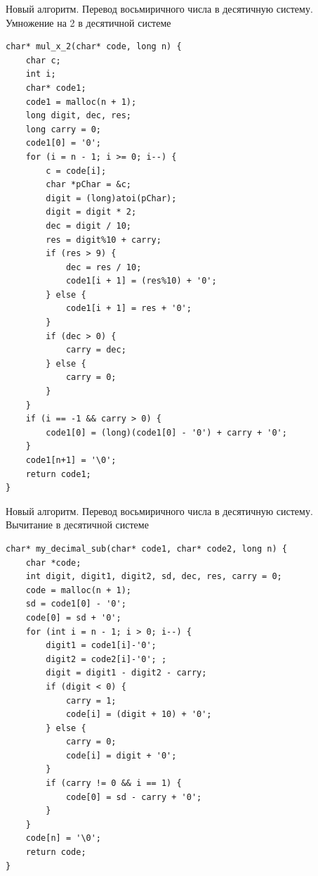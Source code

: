 \documentclass[14pt, russian]{scrartcl}
\begin{document}
\newpage
\begin{code}
\caption{Новый алгоритм. Перевод восьмиричного числа в десятичную систему. Умножение на 2 в десятичной системе}
\label{lst:octaladd}
\begin{verbatim}
char* mul_x_2(char* code, long n) {
    char c;
    int i;
    char* code1;
    code1 = malloc(n + 1);
    long digit, dec, res;
    long carry = 0;
    code1[0] = '0';
    for (i = n - 1; i >= 0; i--) {
        c = code[i];
        char *pChar = &c;
        digit = (long)atoi(pChar); 
        digit = digit * 2;
        dec = digit / 10;
        res = digit%10 + carry;
        if (res > 9) {
            dec = res / 10;
            code1[i + 1] = (res%10) + '0';
        } else {
            code1[i + 1] = res + '0';
        }
        if (dec > 0) {
            carry = dec;
        } else {
            carry = 0;
        }
    }
    if (i == -1 && carry > 0) {
        code1[0] = (long)(code1[0] - '0') + carry + '0';
    }
    code1[n+1] = '\0';
    return code1;
}
\end{verbatim}
\end{code}

\newpage
\begin{code}
\caption{Новый алгоритм. Перевод восьмиричного числа в десятичную систему. Вычитание в десятичной системе}
\label{lst:octaladd}
\begin{verbatim}
char* my_decimal_sub(char* code1, char* code2, long n) {
    char *code;
    int digit, digit1, digit2, sd, dec, res, carry = 0;
    code = malloc(n + 1);
    sd = code1[0] - '0'; 
    code[0] = sd + '0';
    for (int i = n - 1; i > 0; i--) {
        digit1 = code1[i]-'0'; 
        digit2 = code2[i]-'0'; ;
        digit = digit1 - digit2 - carry;
        if (digit < 0) {
            carry = 1;
            code[i] = (digit + 10) + '0';
        } else {
            carry = 0;
            code[i] = digit + '0';
        }
        if (carry != 0 && i == 1) {
            code[0] = sd - carry + '0';
        }
    } 
    code[n] = '\0';
    return code;
}
\end{verbatim}
\end{code}
\end{document}
